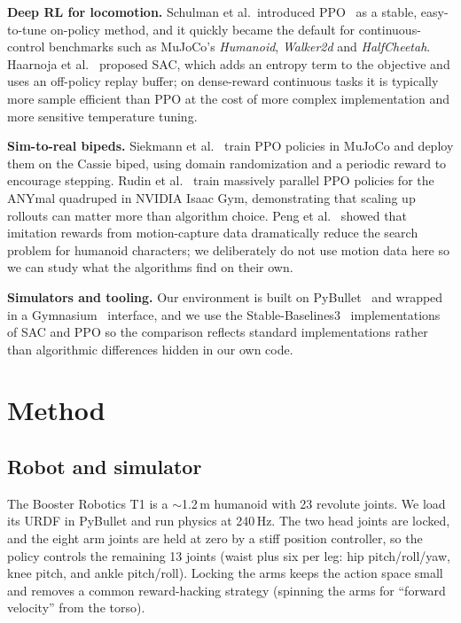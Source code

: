\documentclass[sigconf,nonacm]{acmart}
\begin{document}
\textbf{Deep RL for locomotion.} Schulman et al.\ introduced
PPO~\cite{schulman2017ppo} as a stable, easy-to-tune on-policy method, and it
quickly became the default for continuous-control benchmarks such as MuJoCo's
\textit{Humanoid}, \textit{Walker2d} and \textit{HalfCheetah}. Haarnoja et
al.~\cite{haarnoja2018sac} proposed SAC, which adds an entropy term to the
objective and uses an off-policy replay buffer; on dense-reward continuous
tasks it is typically more sample efficient than PPO at the cost of more
complex implementation and more sensitive temperature tuning.

\textbf{Sim-to-real bipeds.} Siekmann et al.~\cite{siekmann2021sim2real} train
PPO policies in MuJoCo and deploy them on the Cassie biped, using domain
randomization and a periodic reward to encourage stepping. Rudin et
al.~\cite{rudin2022learn} train massively parallel PPO policies for the ANYmal
quadruped in NVIDIA Isaac Gym, demonstrating that scaling up rollouts can
matter more than algorithm choice. Peng et al.~\cite{peng2018deepmimic} showed
that imitation rewards from motion-capture data dramatically reduce the search
problem for humanoid characters; we deliberately do not use motion data here so
we can study what the algorithms find on their own.

\textbf{Simulators and tooling.} Our environment is built on
PyBullet~\cite{coumans2016pybullet} and wrapped in a Gymnasium~\cite{gymnasium}
interface, and we use the Stable-Baselines3~\cite{raffin2021sb3}
implementations of SAC and PPO so the comparison reflects standard
implementations rather than algorithmic differences hidden in our own code.

\section{Method}\label{sec:method}

\subsection{Robot and simulator}
The Booster Robotics T1 is a $\sim$1.2\,m humanoid with 23 revolute joints. We
load its URDF in PyBullet and run physics at 240\,Hz. The two head joints are
locked, and the eight arm joints are held at zero by a stiff position
controller, so the policy controls the remaining 13 joints (waist plus six per
leg: hip pitch/roll/yaw, knee pitch, and ankle pitch/roll). Locking the arms
keeps the action space small and removes a common reward-hacking strategy
(spinning the arms for ``forward velocity'' from the torso).
\end{document}
